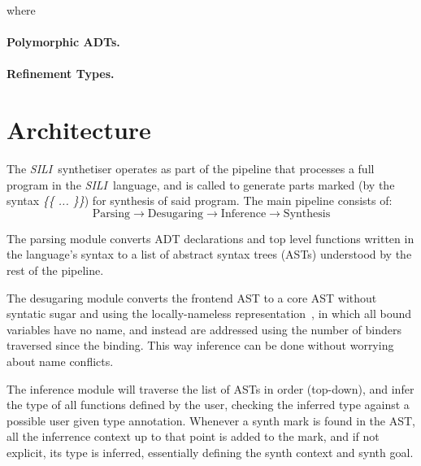 \documentclass{llncs}
\newcommand{\mypara}[1]{\paragraph{\textbf{#1}.}}
\newcommand{\synname}{\emph{SILI}}
\begin{document}
where



\mypara{Polymorphic ADTs}

\mypara{Refinement Types}



\section{Architecture}\label{sec:architecture}

The \synname\ synthetiser operates as part of the pipeline that processes a
full program in the \synname\ language, and is called to generate parts marked
(by the syntax \emph{\{\{ ... \}\}}) for
synthesis of said program. The main pipeline consists of:
\[
    \textrm{Parsing} \rightarrow \textrm{Desugaring} \rightarrow \textrm{Inference} \rightarrow \textrm{Synthesis}
\]

The parsing module converts ADT declarations and top level functions written in
the language's syntax to a list of abstract syntax trees (ASTs) understood by the rest of the
pipeline.

The desugaring module converts the frontend AST to a core AST without syntatic
sugar and using the locally-nameless representation~\cite{locally nameless}, in
which all bound variables have no name, and instead are addressed using the
number of binders traversed since the binding.
This way inference can be done without worrying about name conflicts.

The inference module will traverse the list of ASTs in order (top-down), and
infer the type of all functions defined by the user, checking the inferred
type against a possible user given type annotation. Whenever a synth mark is
found in the AST, all the inferrence context up to that point is added to the
mark, and if not explicit, its type is inferred, essentially defining the synth
context and synth goal.
\end{document}
